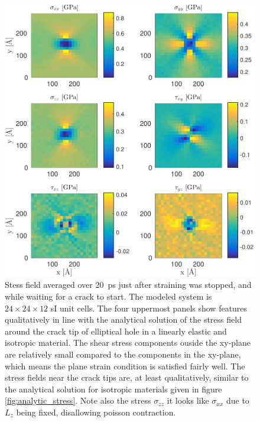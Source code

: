 \begin{figure}
\centering
\includegraphics[width=\textwidth]{../figures/thesis/stressfield_avg_wait_for_crack.pdf}
\caption{Stess field averaged over \SI{20}{\pico\second} just after straining was stopped, and while waiting for a crack to start. The modeled system is $24\times 24\times 12$ sI unit cells. The four uppermost panels show features qualitatively in line with the analytical solution of the stress field around the crack tip of elliptical hole in a linearly elastic and isotropic material. The shear stress components ouside the xy-plane are relatively small compared to the components in the xy-plane, which means the plane strain condition is satisfied fairly well. The stress fields near the crack tips are, at least qualitatively, similar to the analytical solution for isotropic materials given in figure \ref{fig:analytic_stress}. Note also the stress $\sigma_{zz}$ it looks like $\sigma_{xx}$ due to $L_z$ being fixed, disallowing poisson contraction.}
\label{fig:stressfield_avg_wait_for_crack}
\end{figure}


